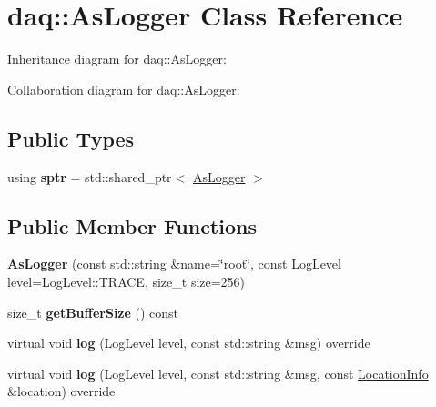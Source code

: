\hypertarget{classdaq_1_1AsLogger}{}\section{daq\+:\+:As\+Logger Class Reference}
\label{classdaq_1_1AsLogger}


Inheritance diagram for daq\+:\+:As\+Logger\+:


Collaboration diagram for daq\+:\+:As\+Logger\+:
\subsection*{Public Types}
\begin{DoxyCompactItemize}
\item 
\mbox{\label{classdaq_1_1AsLogger_a2bf9d0d7cab4b85c4c9e3c2ac3ca7a35}} 
using {\bfseries sptr} = std\+::shared\+\_\+ptr$<$ \hyperlink{classdaq_1_1AsLogger}{As\+Logger} $>$
\end{DoxyCompactItemize}
\subsection*{Public Member Functions}
\begin{DoxyCompactItemize}
\item 
\mbox{\label{classdaq_1_1AsLogger_adac9d2f04cf789defff615ab783e1179}} 
{\bfseries As\+Logger} (const std\+::string \&name=\char`\"{}root\char`\"{}, const Log\+Level level=Log\+Level\+::\+T\+R\+A\+CE, size\+\_\+t size=256)
\item 
\mbox{\label{classdaq_1_1AsLogger_a71775973d10d89465ee4e2184c8751bf}} 
size\+\_\+t {\bfseries get\+Buffer\+Size} () const
\item 
\mbox{\label{classdaq_1_1AsLogger_a25ed3c9ca8f5f994d7b9a364270ad758}} 
virtual void {\bfseries log} (Log\+Level level, const std\+::string \&msg) override
\item 
\mbox{\label{classdaq_1_1AsLogger_a33913aa6e07da0909fd25f5ea5a6c0d9}} 
virtual void {\bfseries log} (Log\+Level level, const std\+::string \&msg, const \hyperlink{classdaq_1_1LocationInfo}{Location\+Info} \&location) override
\end{DoxyCompactItemize}
